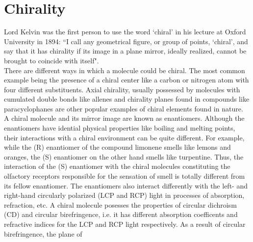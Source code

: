 
\section{Chirality}
Lord Kelvin was the first person to use the word `chiral' in his lecture 
at Oxford University in 1894: ``I call any geometrical figure, or group of points, 
`chiral', and say that it has chirality if its image in a plane mirror, ideally realized, 
cannot be brought to coincide with itself"\cite{Kelvin}. 
\\
There are different ways in which a molecule 
could be chiral. The most common example being the presence of a chiral center 
like a carbon or nitrogen atom with four different substituents. Axial chirality, usually 
possessed by molecules with cumulated double bonds like allenes and chirality planes 
found in compounds like paracyclophanes are other popular examples of chiral elements 
found in nature. \\
A chiral molecule and its mirror image are known as enantiomers. Although the
enantiomers have idential physical properties like boiling and melting points, their
interactions with a chiral environment can be quite different. For example,
while the (R) enantiomer of the compound limonene smells like lemons and oranges, the (S) 
enantiomer on the other hand smells like turpentine. Thus, the interaction of the (S) enantiomer 
with the chiral molecules constituting the olfactory receptors responsible for the sensation of smell 
is totally different from its fellow enantiomer. The enantiomers also interact differently with 
the left- and right-hand circularly polarized (LCP and RCP) light in processes of absorption, 
refraction, etc. A chiral molecule posesses the properties of circular dichroism (CD) and 
circular birefringence, i.e. it has different absorption coefficents and refractive indices 
for the LCP and RCP light respectively. As a result of circular birefringence, the plane of 
